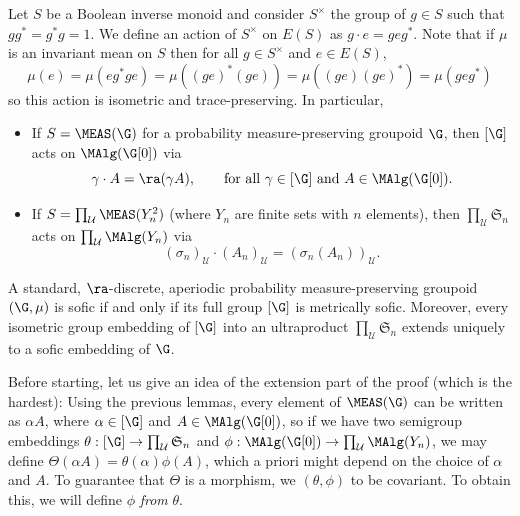 \begin{definition}\label{definitionactionofinvertibleones}
Let $S$ be a Boolean inverse monoid and consider $S^\times$ the group of $g\in S$ such that $gg^*=g^*g=1$. We define an action of $S^\times$ on $E(S)$ as $g\cdot e=geg^*$. Note that if $\mu$ is an invariant mean on $S$ then for all $g\in S^\times$ and $e\in E(S)$,
\[\mu(e)=\mu(eg^*ge)=\mu((ge)^*(ge))=\mu((ge)(ge)^*)=\mu(geg^*)\]
so this action is isometric and trace-preserving. In particular,
\begin{itemize}
\item If $S=\MEAS(\G)$ for a probability measure-preserving groupoid $\G$, then $[\G]$ acts on $\MAlg(\G[0])$ via
\[\gamma\cdot A=\ra(\gamma A),\qquad\text{for all }\gamma\in[\G]\text{ and }A\in\MAlg(\G[0]).\]
\item If $S=\prod_\mathcal{U}\MEAS(Y_n^2)$ (where $Y_n$ are finite sets with $n$ elements), then $\prod_\mathcal{U}\mathfrak{S}_n$ acts on $\prod_\mathcal{U}\MAlg(Y_n)$ via
\[\left(\sigma_n\right)_\mathcal{U}\cdot\left(A_n\right)_\mathcal{U}=\left(\sigma_n(A_n)\right)_\mathcal{U}.\]
\end{itemize}
\end{definition}

\begin{theorem}\label{theoremfirstimportant}
A standard, $\ra$-discrete, aperiodic probability measure-preserving groupoid $(\G,\mu)$ is sofic if and only if its full group $[\G]$ is metrically sofic. Moreover, every isometric group embedding of $[\G]$ into an ultraproduct $\prod_\mathcal{U}\mathfrak{S}_n$ extends uniquely to a sofic embedding of $\G$.
\end{theorem}

Before starting, let us give an idea of the extension part of the proof (which is the hardest): Using the previous lemmas, every element of $\MEAS(\G)$ can be written as $\alpha A$, where $\alpha\in[\G]$ and $A\in\MAlg(\G[0])$, so if we have two semigroup embeddings $\theta:[\G]\to\prod_\mathcal{U}\mathfrak{S}_n$ and $\phi:\MAlg(\G[0])\to\prod_\mathcal{U}\MAlg(Y_n)$, we may define $\Theta(\alpha A)=\theta(\alpha)\phi(A)$, which a priori might depend on the choice of $\alpha$ and $A$. To guarantee that $\Theta$ is a morphism, we $(\theta,\phi)$ to be covariant. To obtain this, we will define $\phi$ \emph{from} $\theta$.


